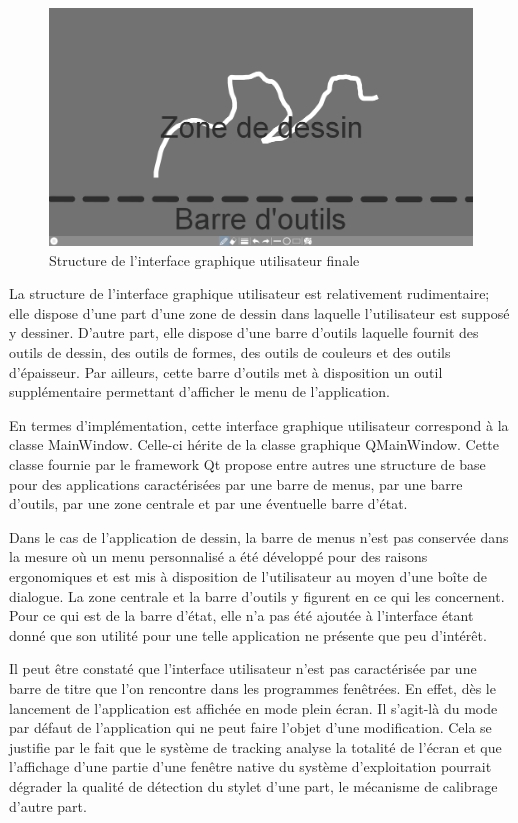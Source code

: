 \documentclass[11pt,a4paper,oldfontcommands]{memoir}
\begin{document}
\begin{figure}[h]
\centering
\includegraphics[scale=0.4]{images/ui-final-structure.png}
\caption{Structure de l'interface graphique utilisateur finale}
\end{figure}

La structure de l'interface graphique utilisateur est relativement rudimentaire; elle dispose d'une part d'une zone de dessin dans laquelle l'utilisateur est supposé y dessiner. D'autre part, elle dispose d'une barre d'outils laquelle fournit des outils de dessin, des outils de formes, des outils de couleurs et des outils d'épaisseur. Par ailleurs, cette barre d'outils met à disposition un outil supplémentaire permettant d'afficher le menu de l'application.

En termes d'implémentation, cette interface graphique utilisateur correspond à la classe MainWindow. Celle-ci hérite de la classe graphique QMainWindow. Cette classe fournie par le framework Qt propose entre autres une structure de base pour des applications caractérisées par une barre de menus, par une barre d'outils, par une zone centrale et par une éventuelle barre d'état. 

Dans le cas de l'application de dessin, la barre de menus n'est pas conservée dans la mesure où un menu personnalisé a été développé pour des raisons ergonomiques et est mis à disposition de l'utilisateur au moyen d'une boîte de dialogue. La zone centrale et la barre d'outils y figurent en ce qui les concernent. Pour ce qui est de la barre d'état, elle n'a pas été ajoutée à l'interface étant donné que son utilité pour une telle application ne présente que peu d'intérêt.

Il peut être constaté que l'interface utilisateur n'est pas caractérisée par une barre de titre que l'on rencontre dans les programmes fenêtrées. En effet, dès le lancement de l'application est affichée en mode plein écran. Il s'agit-là du mode par défaut de l'application qui ne peut faire l'objet d'une modification. Cela se justifie par le fait que le système de tracking analyse la totalité de l'écran et que l'affichage d'une partie d'une fenêtre native du système d'exploitation pourrait dégrader la qualité de détection du stylet d'une part, le mécanisme de calibrage d'autre part.
\end{document}
